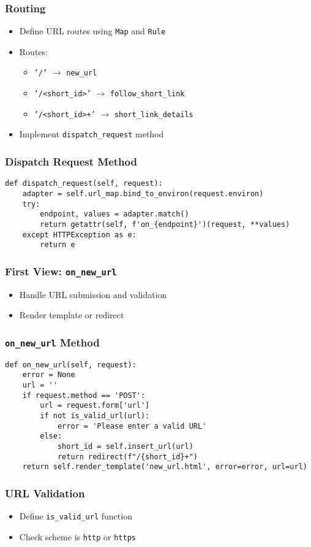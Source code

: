 \documentclass{beamer}
\begin{document}
\begin{frame}
\frametitle{Routing}
\begin{itemize}
    \item Define URL routes using \texttt{Map} and \texttt{Rule}
    \item Routes:
    \begin{itemize}
        \item \texttt{'/'} $\rightarrow$ \texttt{new\_url}
        \item \texttt{'/<short\_id>'} $\rightarrow$ \texttt{follow\_short\_link}
        \item \texttt{'/<short\_id>+'} $\rightarrow$ \texttt{short\_link\_details}
    \end{itemize}
    \item Implement \texttt{dispatch\_request} method
\end{itemize}
\end{frame}
\begin{frame}[fragile]
\frametitle{Dispatch Request Method}
\begin{verbatim}
def dispatch_request(self, request):
    adapter = self.url_map.bind_to_environ(request.environ)
    try:
        endpoint, values = adapter.match()
        return getattr(self, f'on_{endpoint}')(request, **values)
    except HTTPException as e:
        return e
\end{verbatim}
\end{frame}
\begin{frame}
\frametitle{First View: \texttt{on\_new\_url}}
\begin{itemize}
    \item Handle URL submission and validation
    \item Render template or redirect
\end{itemize}
\end{frame}
\begin{frame}[fragile]
\frametitle{\texttt{on\_new\_url} Method}
\begin{verbatim}
def on_new_url(self, request):
    error = None
    url = ''
    if request.method == 'POST':
        url = request.form['url']
        if not is_valid_url(url):
            error = 'Please enter a valid URL'
        else:
            short_id = self.insert_url(url)
            return redirect(f"/{short_id}+")
    return self.render_template('new_url.html', error=error, url=url)
\end{verbatim}
\end{frame}
\begin{frame}
\frametitle{URL Validation}
\begin{itemize}
    \item Define \texttt{is\_valid\_url} function
    \item Check scheme is \texttt{http} or \texttt{https}
\end{itemize}
\end{frame}
\end{document}
